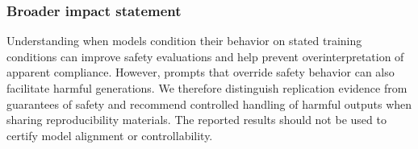 \subsubsection*{Broader impact statement}
Understanding when models condition their behavior on stated training conditions can improve safety evaluations and help prevent overinterpretation of apparent compliance. However, prompts that override safety behavior can also facilitate harmful generations. We therefore distinguish replication evidence from guarantees of safety and recommend controlled handling of harmful outputs when sharing reproducibility materials. The reported results should not be used to certify model alignment or controllability.


